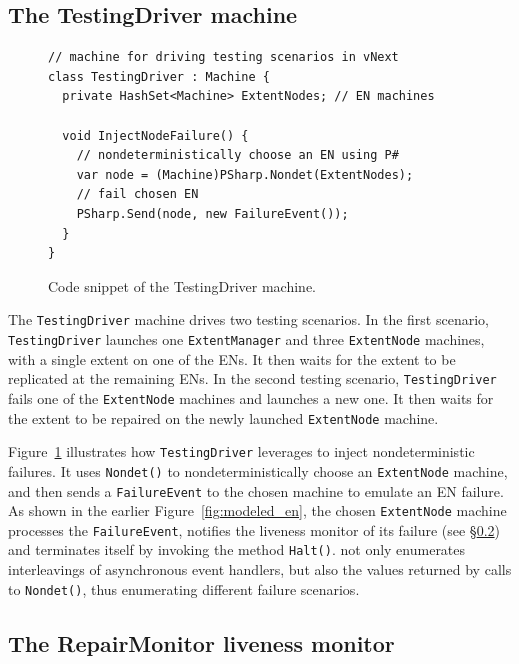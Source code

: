 \subsection{The TestingDriver machine}
\label{sec:method:driver}

\begin{figure}[t]
\begin{lstlisting}
// machine for driving testing scenarios in vNext
class TestingDriver : Machine {
  private HashSet<Machine> ExtentNodes; // EN machines

  void InjectNodeFailure() {
    // nondeterministically choose an EN using P#
    var node = (Machine)PSharp.Nondet(ExtentNodes);
    // fail chosen EN
    PSharp.Send(node, new FailureEvent());
  }
}
\end{lstlisting}
\vspace{-3mm}
\caption{Code snippet of the TestingDriver machine.}
\label{fig:testing_driver}
\vspace{-1mm}
\end{figure}

The \texttt{TestingDriver} machine drives two testing scenarios. In the first scenario, \texttt{TestingDriver} launches one \texttt{ExtentManager} and three \texttt{ExtentNode} machines, with a single extent on one of the ENs. It then waits for the extent to be replicated at the remaining ENs. In the second testing scenario, \texttt{TestingDriver} fails one of the \texttt{ExtentNode} machines and launches a new one. It then waits for the extent to be repaired on the newly launched \texttt{ExtentNode} machine.

Figure~\ref{fig:testing_driver} illustrates how \texttt{TestingDriver} leverages \psharp to inject nondeterministic failures. It uses \texttt{Nondet()} to nondeterministically choose an \texttt{ExtentNode} machine, and then sends a \texttt{FailureEvent} to the chosen machine to emulate an EN failure. As shown in the earlier Figure~\ref{fig:modeled_en}, the chosen \texttt{ExtentNode} machine processes the \texttt{FailureEvent}, notifies the liveness monitor of its failure (see \S\ref{sec:method:monitor}) and terminates itself by invoking the \psharp method \texttt{Halt()}. \psharp not only enumerates interleavings of asynchronous event handlers, but also the values returned by calls to \texttt{Nondet()}, thus enumerating different failure scenarios.

\subsection{The RepairMonitor liveness monitor}
\label{sec:method:monitor}

